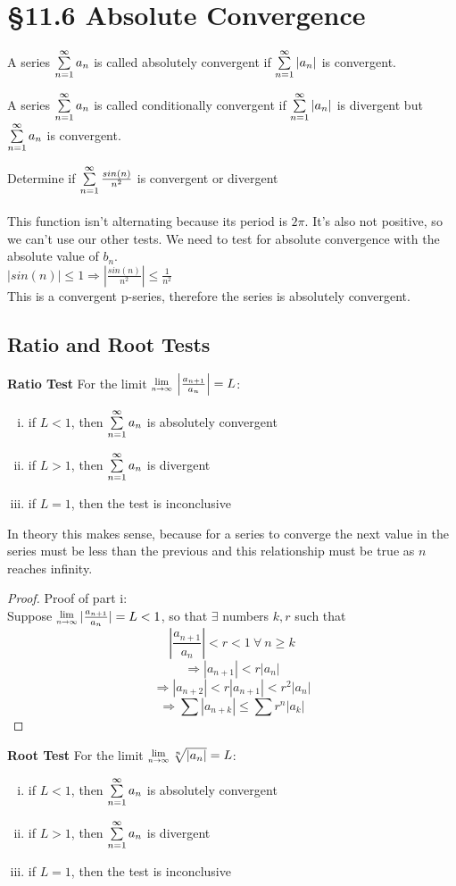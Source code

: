 \documentclass[12 pt]{article}
\begin{document}
	\section{\S 11.6 Absolute Convergence}
		\begin{def*}
			A series $\sum\limits_{n=1}^{\infty} a_n$ is called absolutely convergent if $\sum\limits_{n=1}^{\infty}\left|a_n\right|$ is convergent.
		\end{def*}
		\begin{def*}
			A series $\sum\limits_{n=1}^{\infty} a_n$ is called conditionally convergent if $\sum\limits_{n=1}^{\infty}\left|a_n\right|$ is divergent but $\sum\limits_{n=1}^{\infty} a_n$ is convergent.
		\end{def*}
		\begin{exmp*}
			Determine if $\sum\limits_{n=1}^{\infty} \frac{sin(n)}{n^2}$ is convergent or divergent\\\\
			This function isn't alternating because its period is $2\pi$. It's also not positive, so we can't use our other tests. We need to test for absolute convergence with the absolute value of $b_n$.\\
			$\left|sin(n)\right|\leq 1\Rightarrow \left|\frac{sin(n)}{n^2}\right|\leq \frac{1}{n^2}$\\
			This is a convergent p-series, therefore the series is absolutely convergent.
		\end{exmp*}
	\subsection{Ratio and Root Tests}
		\textbf{Ratio Test}
		For the limit $\Lim{n\toinfty}\left|\frac{a_{n+1}}{a_n}\right|=L$:
		\begin{enumerate}[i)]
			\item if $L<1$, then $\sum\limits_{n=1}^{\infty} a_n$ is absolutely convergent
			\item if $L>1$, then $\sum\limits_{n=1}^{\infty} a_n$ is divergent
			\item if $L=1$, then the test is inconclusive
		\end{enumerate}
		In theory this makes sense, because for a series to converge the next value in the series must be less than the previous and this relationship must be true as $n$ reaches infinity.
		\begin{proof}
			Proof of part i:\\
			Suppose $\Lim{n\toinfty} \lvert \frac{a_{n+1}}{a_n} \rvert=L<1$, so that $\exists$ numbers $k,r$ such that
			$$\left|\frac{a_{n+1}}{a_n}\right|<r<1\ \forall\ n\geq k$$
			$$\Rightarrow \left|a_{n+1}\right|<r\left|a_n\right|$$
			$$\Rightarrow \left|a_{n+2}\right|<r\left|a_{n+1}\right|<r^2\left|a_n\right|$$
			$$\Rightarrow \sum\left|a_{n+k}\right|\leq\sum r^n\left|{a_k}\right|$$
		\end{proof}
		\textbf{Root Test}
		For the limit $\Lim{n\toinfty}\sqrt[n]{\lvert a_n\rvert}=L$:
		\begin{enumerate}[i)]
			\item if $L<1$, then $\sum\limits_{n=1}^{\infty} a_n$ is absolutely convergent
			\item if $L>1$, then $\sum\limits_{n=1}^{\infty} a_n$ is divergent
			\item if $L=1$, then the test is inconclusive
		\end{enumerate}
\end{document}
